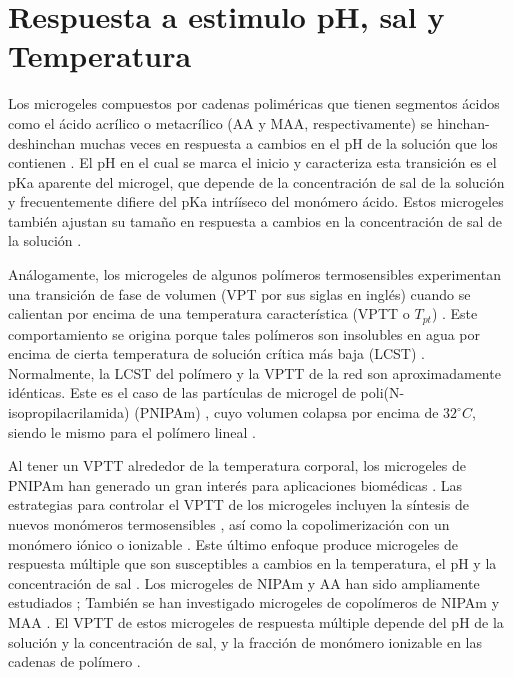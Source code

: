\section{Respuesta a estimulo pH, sal y Temperatura}

	
Los microgeles compuestos por cadenas polim\'ericas que tienen segmentos \'acidos como el \'acido acr\'ilico o metacr\'ilico (AA y MAA, respectivamente) se hinchan-deshinchan muchas veces en respuesta a cambios en el pH de la soluci\'on que los contienen \cite{snowden1996colloidal}.
El pH en el cual se marca el inicio y caracteriza esta transici\'on es el pKa aparente del microgel, que depende de la concentraci\'on de sal de la soluci\'on y frecuentemente difiere del pKa intrí\'iseco del mon\'omero \'acido.
Estos microgeles tambi\'en ajustan su tama\~no en respuesta a cambios en la concentraci\'on de sal de la soluci\'on \cite{snowden1996colloidal}.
	
An\'alogamente, los microgeles de algunos pol\'imeros termosensibles experimentan una transici\'on de fase de volumen (VPT por sus siglas en ingl\'es) cuando se calientan por encima de una temperatura caracter\'istica (VPTT o $T_{pt}$) \cite{Pelton1986,Pelton2000}.
Este comportamiento se origina porque tales pol\'imeros son insolubles en agua por encima de cierta temperatura de soluci\'on cr\'itica m\'as baja (LCST) \cite{Kawaguchi2020}.
Normalmente, la LCST del pol\'imero y la VPTT de la red  son aproximadamente id\'enticas. 
Este es el caso de las part\'iculas de microgel de poli(N-isopropilacrilamida) (PNIPAm) \cite{Pelton1986}, cuyo volumen colapsa por encima de $32   ^\circ C$, siendo le mismo para el  pol\'imero lineal \cite{Schild1992}.
	
Al tener un VPTT alrededor de la temperatura corporal, los microgeles de PNIPAm han generado un gran inter\'es para aplicaciones biom\'edicas \cite{Guan2011}.
Las estrategias para controlar el VPTT de los microgeles incluyen la s\'intesis de nuevos mon\'omeros termosensibles  \cite{Cai2007,Macchione2019}, as\'i como la copolimerizaci\'on con un mon\'omero i\'onico o ionizable  \cite{Hirose1987,Lopez2020}.
Este \'ultimo enfoque produce microgeles de respuesta m\'ultiple que son susceptibles a cambios en la temperatura, el pH y la concentraci\'on de sal  \cite{snowden1996colloidal, Farooqi2017}.
Los microgeles de NIPAm y AA han sido ampliamente estudiados \cite{Morris1997, Jones2000,Bradley2005,Begum2016};
Tambi\'en se han investigado microgeles de copol\'imeros de NIPAm y MAA  \cite{Dowding2000,Hoare2004,Giussi2015}.
El VPTT de estos microgeles de respuesta m\'ultiple depende del pH de la soluci\'on y la concentraci\'on de sal, y la fracci\'on de mon\'omero ionizable en las cadenas de pol\'imero  \cite{Morris1997,Jones2000, Hoare2004, Bradley2005, Lee2008,Wong2009,Hamzavi2016}.



